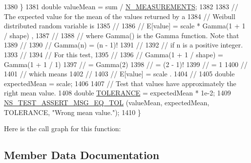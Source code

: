 \begin{DoxyCode}
1380     \}
1381   \textcolor{keywordtype}{double} valueMean = sum / \hyperlink{classRandomVariableStreamWeibullTestCase_a1f058dd1e083f78a0912c228cd1753bc}{N\_MEASUREMENTS};
1382 
1383   \textcolor{comment}{// The expected value for the mean of the values returned by a}
1384   \textcolor{comment}{// Weibull distributed random variable is}
1385   \textcolor{comment}{//}
1386   \textcolor{comment}{//     E[value]  =  scale * Gamma(1 + 1 / shape)  ,}
1387   \textcolor{comment}{//               }
1388   \textcolor{comment}{// where Gamma() is the Gamma function.  Note that }
1389   \textcolor{comment}{//               }
1390   \textcolor{comment}{//     Gamma(n)  =  (n - 1)!}
1391   \textcolor{comment}{//               }
1392   \textcolor{comment}{// if n is a positive integer.}
1393   \textcolor{comment}{//}
1394   \textcolor{comment}{// For this test,}
1395   \textcolor{comment}{//}
1396   \textcolor{comment}{//     Gamma(1 + 1 / shape)  =  Gamma(1 + 1 / 1)}
1397   \textcolor{comment}{//                           =  Gamma(2)}
1398   \textcolor{comment}{//                           =  (2 - 1)!}
1399   \textcolor{comment}{//                           =  1}
1400   \textcolor{comment}{//}
1401   \textcolor{comment}{// which means}
1402   \textcolor{comment}{//}
1403   \textcolor{comment}{//     E[value]  =  scale  .}
1404   \textcolor{comment}{//               }
1405   \textcolor{keywordtype}{double} expectedMean = scale;
1406 
1407   \textcolor{comment}{// Test that values have approximately the right mean value.}
1408   \textcolor{keywordtype}{double} \hyperlink{spectrum-value-test_8cc_a30c17564229ec2e37dfea9c6c9ad643e}{TOLERANCE} = expectedMean * 1e-2;
1409   \hyperlink{group__testing_ga9e7861b56b4e70db3b56044cb7a28e41}{NS\_TEST\_ASSERT\_MSG\_EQ\_TOL} (valueMean, expectedMean, TOLERANCE, \textcolor{stringliteral}{"Wrong mean
       value."}); 
1410 \}
\end{DoxyCode}


Here is the call graph for this function\+:




\subsection{Member Data Documentation}
